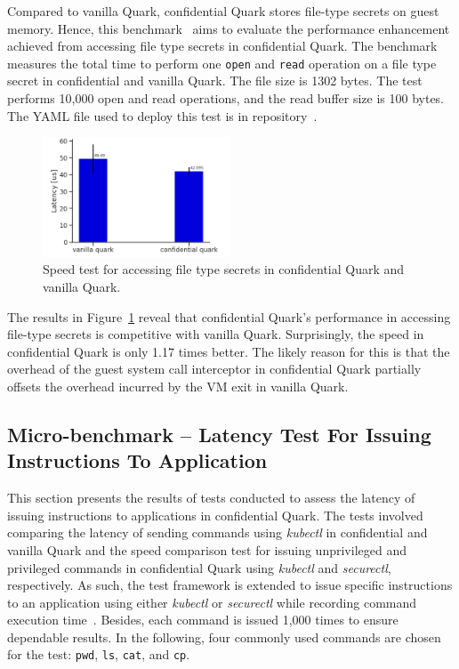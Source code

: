 Compared to vanilla Quark, confidential Quark stores file-type secrets on guest memory. Hence, this benchmark~\cite*{benchamark_filebase_secret} aims to evaluate the performance enhancement achieved from accessing file type secrets in confidential Quark. 
The benchmark measures the total time to perform one \texttt{open} and \texttt{read} operation on a file type secret in confidential and vanilla Quark. The file size is 1302 bytes. The test performs 10,000 open and read operations, and the read buffer size is 100 bytes. The YAML file used to deploy this test 
is in repository~\cite*{perf_test_repo}.

\begin{figure}[!htb]
    \centering
    \includegraphics[width=0.5\textwidth]{images/reading_speed_of_file_type_secrets_in_Baseline_and_Cquark.PNG}
    \caption[Speed test for accessing file type secrets in confidential Quark and vanilla Quark]{Speed test for accessing file type secrets in confidential Quark and vanilla Quark.}
    \label{fig:reading_speed_of_file_type_secrets_in_Baseline_and_Cquark}
\end{figure}

The results in Figure~\ref{fig:reading_speed_of_file_type_secrets_in_Baseline_and_Cquark} reveal that confidential Quark's performance in accessing file-type secrets is competitive with vanilla Quark. Surprisingly, the speed in 
confidential Quark is only 1.17 times better. The likely reason for this is that the overhead of the guest system call interceptor in confidential Quark partially offsets the overhead incurred by the VM exit in vanilla Quark.

\subsection{Micro-benchmark – Latency Test For Issuing Instructions To Application}\label{bench_issuing_Instructions}

This section presents the results of tests conducted to assess the latency of issuing instructions to applications in confidential Quark. The tests involved comparing the latency of sending commands using \emph{kubectl} in confidential and vanilla Quark and the speed comparison test for issuing 
unprivileged and privileged commands in confidential Quark using \emph{kubectl} and \emph{securectl}, respectively. As such, the test framework is extended to issue specific instructions to an application using either \emph{kubectl} or \emph{securectl} while recording command execution time~\cite*{benchamark_perf_kubectl}. 
Besides, each command is issued 1,000 times to ensure dependable results. In the following, four commonly used commands are chosen for the test: \texttt{pwd}, \texttt{ls}, \texttt{cat}, and \texttt{cp}.



